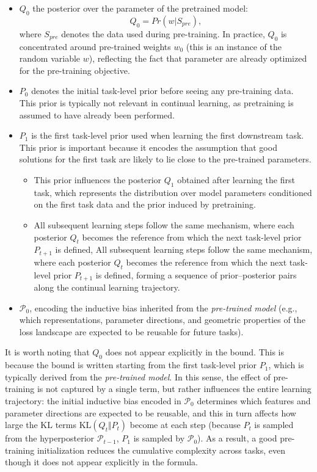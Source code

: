 \documentclass{article}
\theoremstyle{plain}
\theoremstyle{definition}
\theoremstyle{remark}
\begin{document}
\begin{itemize}
    \item $Q_0$ the posterior over the parameter of the pretrained model:
    \begin{equation}
    Q_0 = Pr(w | S_{pre}),
\end{equation}
where $S_{pre}$ denotes the data used during pre-training. In practice, $Q_0$ is concentrated around pre-trained weights  $w_0$ (this is an instance of the random variable $w$), reflecting the fact that parameter are already optimized for the pre-training objective.
\item  $P_0$ denotes the initial task-level prior before seeing any pre-training data. This prior is typically not relevant in continual learning, as pretraining is assumed to have already been performed. 
\item $P_1$ is the first task-level prior used when learning the first downstream task. This prior is important because it encodes the assumption that good solutions for the first task are likely to lie close to the pre-trained parameters.
\begin{itemize}
    \item This prior influences the posterior $Q_1$ obtained after learning the first task, which represents the distribution over model parameters conditioned on the first task data and the prior induced by pretraining.
    \item All subsequent learning steps follow the same mechanism, where each posterior $Q_t$
 becomes the reference from which the next task-level prior $P_{t+1}$ is defined, All subsequent learning steps follow the same mechanism, where each posterior $Q_t$
 becomes the reference from which the next task-level prior $P_{t+1}$ is defined, forming a sequence of prior–posterior pairs along the continual learning trajectory.
\end{itemize}
\item  $\mathcal P_0$, encoding the inductive bias inherited from the \textit{pre-trained model} (e.g., which representations, parameter directions, and geometric properties of the loss landscape are expected to be reusable for future tasks).
\end{itemize}

It is worth noting that $Q_0$ does not appear explicitly in the bound. This is because the bound is written starting from the first task-level prior $P_1$, which is typically derived from the \textit{pre-trained model}. In this sense, the effect of pre-training is not captured by a single term, but rather influences the entire learning trajectory: the initial inductive bias encoded in $\mathcal P_0$ determines which features and parameter directions are expected to be reusable, and this in turn affects how large the KL terms $\mathrm{KL}(Q_t \Vert P_t)$ become at each step (because $P_t$ is sampled from the hyperposterior $\mathcal{P}_{t-1}$, $P_1$ is sampled by $\mathcal{P}_0$). As a result, a good pre-training initialization reduces the cumulative complexity across tasks, even though it does not appear explicitly in the formula.
\end{document}
